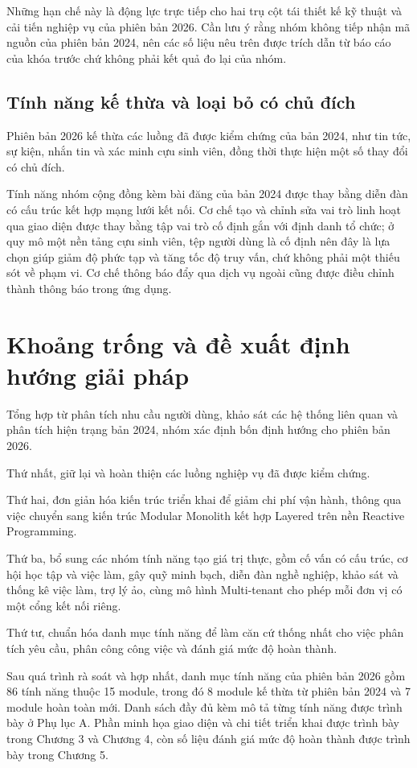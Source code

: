 \documentclass[12pt,a4paper,oneside]{report}
\begin{document}
Những hạn chế này là động lực trực tiếp cho hai trụ cột tái thiết kế kỹ thuật và cải tiến nghiệp vụ của phiên bản 2026. Cần lưu ý rằng nhóm không tiếp nhận mã nguồn của phiên bản 2024, nên các số liệu nêu trên được trích dẫn từ báo cáo của khóa trước chứ không phải kết quả đo lại của nhóm.

\subsection{Tính năng kế thừa và loại bỏ có chủ đích}

Phiên bản 2026 kế thừa các luồng đã được kiểm chứng của bản 2024, như tin tức, sự kiện, nhắn tin và xác minh cựu sinh viên, đồng thời thực hiện một số thay đổi có chủ đích.

Tính năng nhóm cộng đồng kèm bài đăng của bản 2024 được thay bằng diễn đàn có cấu trúc kết hợp mạng lưới kết nối. Cơ chế tạo và chỉnh sửa vai trò linh hoạt qua giao diện được thay bằng tập vai trò cố định gắn với định danh tổ chức; ở quy mô một nền tảng cựu sinh viên, tệp người dùng là cố định nên đây là lựa chọn giúp giảm độ phức tạp và tăng tốc độ truy vấn, chứ không phải một thiếu sót về phạm vi. Cơ chế thông báo đẩy qua dịch vụ ngoài cũng được điều chỉnh thành thông báo trong ứng dụng.

\section{Khoảng trống và đề xuất định hướng giải pháp}

Tổng hợp từ phân tích nhu cầu người dùng, khảo sát các hệ thống liên quan và phân tích hiện trạng bản 2024, nhóm xác định bốn định hướng cho phiên bản 2026.

Thứ nhất, giữ lại và hoàn thiện các luồng nghiệp vụ đã được kiểm chứng.

Thứ hai, đơn giản hóa kiến trúc triển khai để giảm chi phí vận hành, thông qua việc chuyển sang kiến trúc Modular Monolith kết hợp Layered trên nền Reactive Programming.

Thứ ba, bổ sung các nhóm tính năng tạo giá trị thực, gồm cố vấn có cấu trúc, cơ hội học tập và việc làm, gây quỹ minh bạch, diễn đàn nghề nghiệp, khảo sát và thống kê việc làm, trợ lý ảo, cùng mô hình Multi-tenant cho phép mỗi đơn vị có một cổng kết nối riêng.

Thứ tư, chuẩn hóa danh mục tính năng để làm căn cứ thống nhất cho việc phân tích yêu cầu, phân công công việc và đánh giá mức độ hoàn thành.

Sau quá trình rà soát và hợp nhất, danh mục tính năng của phiên bản 2026 gồm 86 tính năng thuộc 15 module, trong đó 8 module kế thừa từ phiên bản 2024 và 7 module hoàn toàn mới. Danh sách đầy đủ kèm mô tả từng tính năng được trình bày ở Phụ lục A. Phần minh họa giao diện và chi tiết triển khai được trình bày trong Chương 3 và Chương 4, còn số liệu đánh giá mức độ hoàn thành được trình bày trong Chương 5.
\end{document}
